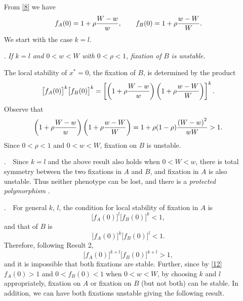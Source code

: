 \documentclass[9pt,twocolumn,twoside,lineno]{pnas-new}
\begin{document}
   From \eqref{8} we have
   \begin{equation}
   f_A(0) = 1+\rho{W-w\over w},\qquad
   f_B(0) = 1+\rho{w-W\over W}.\label{12}\end{equation}
   We start with the case $k=l$.
   \medskip
   
   . {\sl If $k=l$ and $0<w<W$ with $0<\rho<1$, fixation of $B$ is unstable.}\par
   \medskip
   
    The local stability of $x^*=0$, the fixation of $B$, is determined by the product
   \begin{equation}
   \bigl[f_A(0)\bigr]^k \bigl[f_B(0)\bigr]^k=\left[\left(1+\rho{W-w\over w}\right)\left(1+\rho{w-W\over W}\right)\right]^k.\label{13}\end{equation}
   Observe that
   \begin{equation}
   \left(1+\rho{W-w\over w}\right)\left(1+\rho{w-W\over W}\right) = 1+\rho(1-\rho){\left(W-w\right)^2\over wW}>1.\label{14}\end{equation}
   Since $0<\rho<1$ and $0<w<W$,  fixation on $B$ is unstable.
  \bigskip

\smallskip

.\ \ Since $k=l$ and the above result also holds  when $0<W<w$, there is total symmetry between the two fixations in $A$ and $B$, and fixation in $A$ is also unstable. Thus neither phenotype can be lost, and there is a {\sl protected polymorphism} \cite{prout1968sufficient}.
\smallskip

.\ \ For general $k$, $l$, the condition for local stability of fixation in $A$ is
\begin{equation}\bigl[f_A(0)\bigr]^l \bigl[f_B(0)\bigr]^k <1, \label{15}\end{equation}
and that of $B$ is
\begin{equation}\bigl[f_A(0)\bigr]^k \bigl[f_B(0)\bigr]^l <1. \label{16}\end{equation}
Therefore, following Result 2, 
\begin{equation}\bigl[f_A(0)\bigr]^{k+l}\bigl[f_B(0)\bigr]^{k+l}>1,\label{17}\end{equation}
and it is impossible that both fixations are stable. Further, since by \eqref{12}  $f_A(0)>1$ and $0<f_B(0)<1$ when $0<w<W$, by choosing $k$ and $l$ appropriately, fixation on $A$ or fixation on $B$ (but not both) can be stable. In addition, we can have both fixations unstable giving the following result.
\medskip
\end{document}
